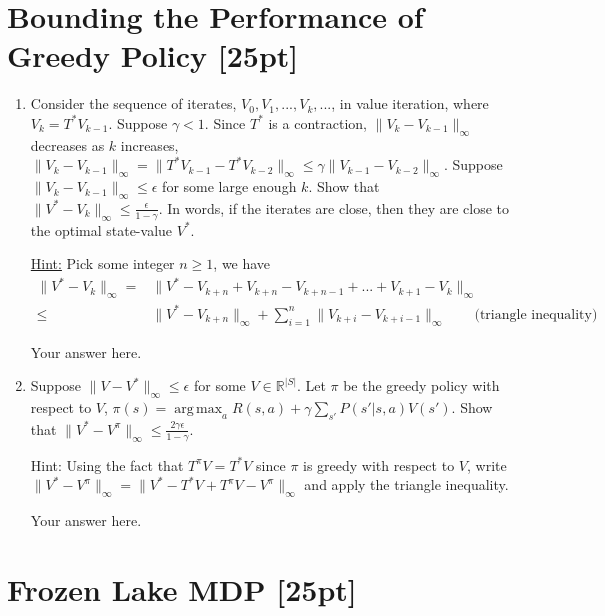 \documentclass[11pt]{article}
\theoremstyle{case}
\newcommand{\norm}[2][2]{\| #2\|}
\DeclareMathOperator*{\argmax}{arg\,max}
\begin{document}
\section{Bounding the Performance of Greedy Policy [25pt]}
\begin{enumerate}[label=(\alph*)]
    \item Consider the sequence of iterates, $V_0, V_1,...,V_k,...$, in value iteration, where $V_k = T^* V_{k-1}$.
    Suppose $\gamma<1$.
    Since $T^*$ is a contraction, $\norm{V_k-V_{k-1}}_\infty$ decreases as $k$ increases, $\norm{V_k-V_{k-1}}_\infty = \norm{T^*V_{k-1}-T^*V_{k-2}}_\infty \leq \gamma\norm{V_{k-1}-V_{k-2}}_\infty$.
    Suppose $\norm{V_k-V_{k-1}}_\infty \leq \epsilon$ for some large enough $k$.
    Show that $\norm{V^*-V_k}_\infty \leq \frac{\epsilon}{1-\gamma}$. In words, if the iterates are close, then they are close to the optimal state-value $V^*$.
    
    \underline{Hint:} Pick some integer $n\geq1$, we have 
    \begin{align*}
        \norm{V^*-V_k}_\infty =& \norm{V^*-V_{k+n} + V_{k+n} - V_{k+n-1} +...+V_{k+1}-V_k}_\infty \\
        \leq&  \norm{V^*-V_{k+n}}_\infty + \sum_{i=1}^{n} \norm{V_{k+i}-V_{k+i-1}}_\infty  \qquad \text {(triangle inequality)}
    \end{align*}
    \begin{shaded}
    Your answer here.
    \end{shaded}
    
    \item Suppose $\norm{V-V^*}_\infty\leq\epsilon$ for some $V\in\mathbb{R}^{|S|}$. Let $\pi$ be the greedy policy with respect to $V$, $\pi(s)=\argmax_a R(s,a) + \gamma  \sum_{s'}P(s'|s,a)V(s')$.
    Show that  $\norm{V^* -V^\pi}_\infty \leq \frac{2\gamma\epsilon}{1-\gamma}$.
    
    Hint: Using the fact that $T^\pi V = T^* V$ since $\pi$ is greedy with respect to $V$, write $\norm{V^* -V^\pi}_\infty = \norm{V^* -T^* V + T^\pi V - V^\pi}_\infty$ and apply the triangle inequality.
    \begin{shaded}
    Your answer here.
    \end{shaded}
\end{enumerate}


\newpage
\section{Frozen Lake MDP [25pt]}
\end{document}
